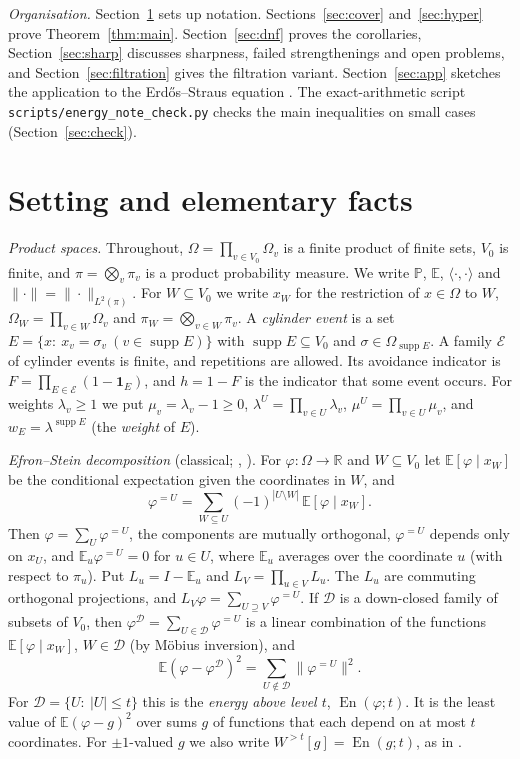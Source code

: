 \documentclass[11pt,reqno]{amsart}
\theoremstyle{definition}
\newcommand{\E}{\mathbb E}
\newcommand{\PP}{\mathbb P}
\newcommand{\supp}{\operatorname{supp}}
\newcommand{\energy}{\operatorname{En}}
\newcommand{\cE}{\mathcal E}
\newcommand{\cD}{\mathcal D}
\begin{document}
\emph{Organisation.}  Section~\ref{sec:prelim} sets up notation.
Sections~\ref{sec:cover} and~\ref{sec:hyper} prove Theorem~\ref{thm:main}.
Section~\ref{sec:dnf} proves the corollaries, Section~\ref{sec:sharp} discusses
sharpness, failed strengthenings and open problems, and
Section~\ref{sec:filtration} gives the filtration variant.
Section~\ref{sec:app} sketches the application to the Erd\H{o}s--Straus
equation \cite{Subexp}.  The exact-arithmetic script
\texttt{scripts/energy\_note\_check.py} checks the main inequalities on small
cases (Section~\ref{sec:check}).

\section{Setting and elementary facts}\label{sec:prelim}

\emph{Product spaces.}  Throughout, $\Omega=\prod_{v\in V_0}\Omega_v$ is a finite product
of finite sets, $V_0$ is finite, and $\pi=\bigotimes_v\pi_v$ is a product
probability measure.  We write $\PP$, $\E$, $\langle\cdot,\cdot\rangle$ and
$\|\cdot\|=\|\cdot\|_{L^2(\pi)}$.  For $W\subseteq V_0$ we write $x_W$ for the restriction
of $x\in\Omega$ to $W$, $\Omega_W=\prod_{v\in W}\Omega_v$ and $\pi_W=\bigotimes_{v\in W}\pi_v$.  A
\emph{cylinder event} is a set $E=\{x:\ x_v=\sigma_v\ (v\in\supp E)\}$ with
$\supp E\subseteq V_0$ and $\sigma\in\Omega_{\supp E}$.  A family $\cE$ of cylinder events is
finite, and repetitions are allowed.  Its avoidance indicator is
$F=\prod_{E\in\cE}(1-\mathbf 1_E)$, and $h=1-F$ is the indicator that some event occurs.
For weights $\lambda_v\ge1$ we put $\mu_v=\lambda_v-1\ge0$, $\lambda^U=\prod_{v\in U}\lambda_v$,
$\mu^U=\prod_{v\in U}\mu_v$, and $w_E=\lambda^{\supp E}$ (the \emph{weight} of $E$).

\emph{Efron--Stein decomposition} (classical; \cite{ES,Hoeffding},
\cite[\S8.3]{OD}).  For $\varphi:\Omega\to\mathbb R$ and $W\subseteq V_0$ let
$\E[\varphi\mid x_W]$ be the conditional expectation given the coordinates in
$W$, and
\[
 \varphi^{=U}=\sum_{W\subseteq U}(-1)^{|U\setminus W|}\,\E[\varphi\mid x_W].
\]
Then $\varphi=\sum_U\varphi^{=U}$, the components are mutually orthogonal,
$\varphi^{=U}$ depends only on $x_U$, and $\E_u\varphi^{=U}=0$ for $u\in U$, where
$\E_u$ averages over the coordinate $u$ (with respect to $\pi_u$).  Put
$L_u=I-\E_u$ and $L_V=\prod_{u\in V}L_u$.  The $L_u$ are commuting orthogonal
projections, and $L_V\varphi=\sum_{U\supseteq V}\varphi^{=U}$.  If $\cD$ is a down-closed
family of subsets of $V_0$, then $\varphi^{\cD}=\sum_{U\in\cD}\varphi^{=U}$ is a linear
combination of the functions $\E[\varphi\mid x_W]$, $W\in\cD$ (by M\"obius
inversion), and
\begin{equation}\label{eq:energy}
 \E(\varphi-\varphi^{\cD})^2=\sum_{U\notin\cD}\|\varphi^{=U}\|^2 .
\end{equation}
For $\cD=\{U:\ |U|\le t\}$ this is the \emph{energy above level $t$},
$\energy(\varphi;t)$.  It is the least value of $\E(\varphi-g)^2$ over sums $g$
of functions that each depend on at most $t$ coordinates.  For $\pm1$-valued
$g$ we also write $W^{>t}[g]=\energy(g;t)$, as in \cite{OD}.
\end{document}
